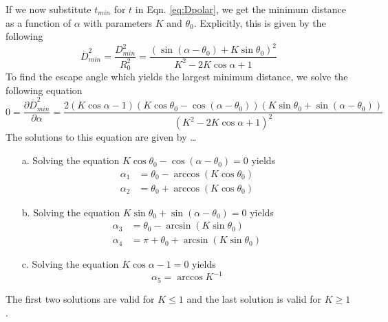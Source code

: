 \documentclass[12pt]{article}
\def\ds{\displaystyle}
\def\d{\partial}
\newcommand{\ol}{\overline}
\begin{document}
If we now substitute $t_{min}$ for $t$ in Eqn. \ref{eq:Dpolar}, we get the minimum distance as a function of $\alpha$ with parameters $K$ and $\theta_0$. Explicitly, this is given by the following 
%
\begin{equation}
\ol{D}^2_{min}= \ds\frac{{D}^2_{min}}{R_0^2 }=
\ds\frac{\left ( \sin(\alpha - \theta_0) + K \sin \theta_0 \right )^2}{K^2-2 K \cos \alpha +1} 
\label{eq:Dmin_polar}
\end{equation}
%
To find the escape angle which yields the largest minimum distance, we solve the following equation
%
\begin{equation}
0 = \frac{\d \ol{D}^2_{min}}{\d \alpha} = 
\frac{2(K \cos \alpha - 1)(K\cos \theta_0 - \cos(\alpha - \theta_0))(K\sin \theta_0 + \sin(\alpha -\theta_0))}
{(K^2 - 2K \cos \alpha + 1)^2}
\end{equation} 
%
The solutions to this equation are given by \dots
\begin{enumerate}
\item[a.] Solving the equation $K\cos \theta_0 - \cos(\alpha - \theta_0) = 0$ yields
%
\begin{align*}
\alpha_1 & = \theta_0 - \arccos(K \cos \theta_0) \\
\alpha_2 & = \theta_0 + \arccos(K \cos \theta_0)
\end{align*}
%
\item[b.] Solving the equation $K\sin \theta_0 + \sin(\alpha -\theta_0) = 0$ yields
%
\begin{align*}
\alpha_3 & = \theta_0 - \arcsin(K \sin \theta_0) \\
\alpha_4 & = \pi + \theta_0 + \arcsin(K \sin \theta_0)
\end{align*}
%
\item[c.] Solving the equation $K \cos \alpha - 1 = 0$ yields
\begin{equation*}
\alpha_5 = \arccos K^{-1}
\end{equation*}
\end{enumerate}
The first two solutions are valid for $K \leq 1$ and the last solution is valid for $K \geq 1$.
\end{document}

